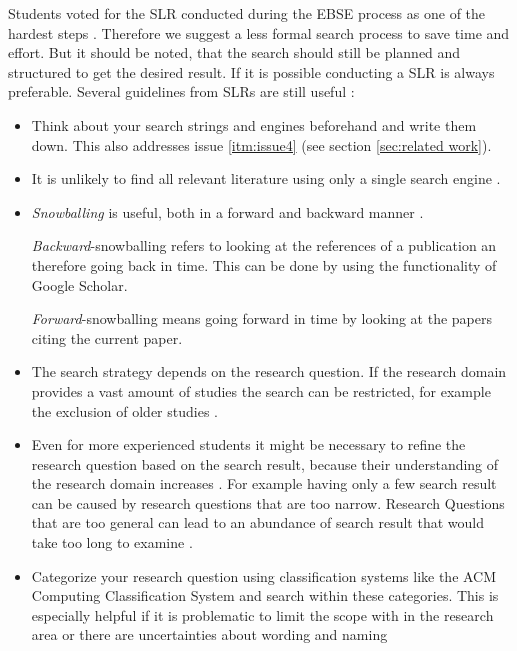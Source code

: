 Students voted for the SLR conducted during the EBSE process as one of the hardest steps \cite{keele2007}. Therefore we suggest a less formal search process to save time and effort. But it should be noted, that the search should still be planned and structured to get the desired result. If it is possible conducting a SLR is always preferable.
\newline
\newline
Several guidelines from SLRs are still useful :
\begin{itemize}
\item Think about your search strings and engines beforehand and write them down. This also addresses issue \ref{itm:issue4} (see section \ref{sec:related work}).
\item It is unlikely to find all relevant literature using only a single search engine \cite{Brereton2007}. 
\item \emph{Snowballing} is useful, both in a forward and backward manner \cite{Wohlin2014}.

\emph{Backward}-snowballing refers to looking at the references of a publication an therefore going back in time. This can be done by using the  functionality of Google Scholar.

\emph{Forward}-snowballing means going forward in time by looking at the papers citing the current paper.
\item The search strategy depends on the research question. If the research domain provides a vast amount of studies the search can  be restricted, for example the exclusion of older studies \cite{Brereton2007}.
\item Even for more experienced students it might be necessary to refine the research question based on the search result, because their understanding of the research domain increases \cite{Brereton2007}. For example having only a few search result can be caused by research questions that are too narrow. Research Questions that are too general can lead to an abundance of search result that would take too long to examine . 
\item Categorize your research question using classification systems like the ACM Computing Classification System and search within these categories. This is especially helpful if it is problematic to limit the scope with in the research area or there are uncertainties about wording and naming
\end{itemize} 


